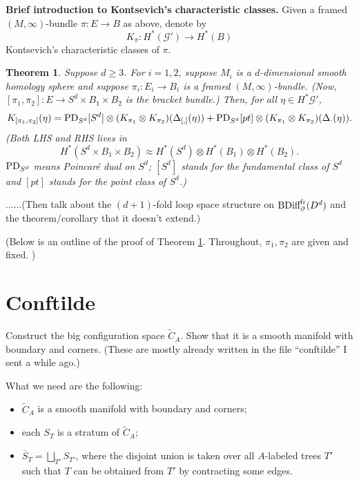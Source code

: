 \documentclass[11pt]{article}
\newtheorem{thm}{Theorem}[section]
\theoremstyle{definition}
\theoremstyle{remark}
\def\cG{\mathcal{G}}
\def\tn#1{\textnormal{#1}}
\begin{document}
{\bf Brief introduction to Kontsevich's characteristic classes.}
Given a framed $(M,\infty)$-bundle $\pi:E\to B$ as above, denote by  
$$K_\pi: H^*(\cG')\longrightarrow H^*(B)$$
Kontsevich's characteristic classes of $\pi$. 


\begin{thm}\label{formula_thm}
Suppose $d\ge3$. 
For $i=1,2$, suppose $M_i$ is a $d$-dimensional smooth homology sphere and 
suppose $\pi_i: E_i\to B_i$ is a framed $(M,\infty)$-bundle. 
(Now, $[\pi_1,\pi_2]: E\to S^d\times B_1\times B_2$ is the bracket bundle.)
Then, for all $\eta\in H^*\cG'$, 
\begin{align*}
K_{[\pi_1,\pi_2]}(\eta)=
\tn{PD}_{S^d}[S^d]\otimes
(K_{\pi_1}\otimes K_{\pi_2})(\Delta_{[,]}(\eta))
+\tn{PD}_{S^d}[pt]\otimes
(K_{\pi_1}\otimes K_{\pi_2})(\Delta_\cdot(\eta)).
\end{align*}
(Both LHS and RHS lives in 
$$H^*(S^d\times B_1\times B_2)\approx H^*(S^d)\otimes H^*(B_1)\otimes H^*(B_2).$$
$\tn{PD}_{S^d}$ means Poincar\'e dual on $S^d$; $[S^d]$ stands for the fundamental class of $S^d$ and $[pt]$ stands for the point class of $S^d$.)
\end{thm}


......(Then talk about the $(d+1)$-fold loop space structure on $\tn{BDiff}^{\tn{fr}}_\partial(D^d)$ and the theorem/corollary that it doesn't extend.)

(Below is an outline of the proof of Theorem \ref{formula_thm}.
Throughout, $\pi_1,\pi_2$ are given and fixed. 
)

\section{Conftilde}\label{conftilde_sec}

Construct the big configuration space $\widetilde{C}_A$. 
Show that it is a smooth manifold with boundary and corners. 
(These are mostly already written in the file ``conftilde'' I sent a while ago.)

What we need are the following: 

\begin{itemize}
\item $\widetilde{C}_A$ is a smooth manifold with boundary and corners; 
\item each $S_T$ is a stratum of $\widetilde{C}_A$; 
\item $\overline{S}_T=\bigsqcup_{T'}S_{T'}$, where the disjoint union is taken over all $A$-labeled trees $T'$ such that $T$ can be obtained from $T'$ by contracting some edges. 

\end{itemize}
\end{document}
